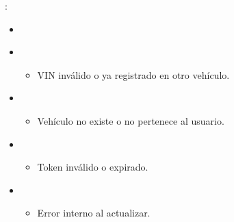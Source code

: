 \documentclass[letterpaper,10pt,spanish]{sphinxmanual}
\begin{document}
\begin{fulllineitems}
\sphinxAtStartPar
{}:
\begin{itemize}
\item {} 
\sphinxAtStartPar
{}

\begin{sphinxVerbatim}[commandchars=\\\{\}]
\end{sphinxVerbatim}

\item {} 
\sphinxAtStartPar
{}
\begin{itemize}
\item {} 
\sphinxAtStartPar
VIN inválido o ya registrado en otro vehículo.

\end{itemize}

\begin{sphinxVerbatim}[commandchars=\\\{\}]
\end{sphinxVerbatim}

\item {} 
\sphinxAtStartPar
{}
\begin{itemize}
\item {} 
\sphinxAtStartPar
Vehículo no existe o no pertenece al usuario.

\end{itemize}

\begin{sphinxVerbatim}[commandchars=\\\{\}]
\end{sphinxVerbatim}

\item {} 
\sphinxAtStartPar
{}
\begin{itemize}
\item {} 
\sphinxAtStartPar
Token inválido o expirado.

\end{itemize}

\item {} 
\sphinxAtStartPar
{}
\begin{itemize}
\item {} 
\sphinxAtStartPar
Error interno al actualizar.

\end{itemize}

\end{itemize}

\end{fulllineitems}
\end{document}
